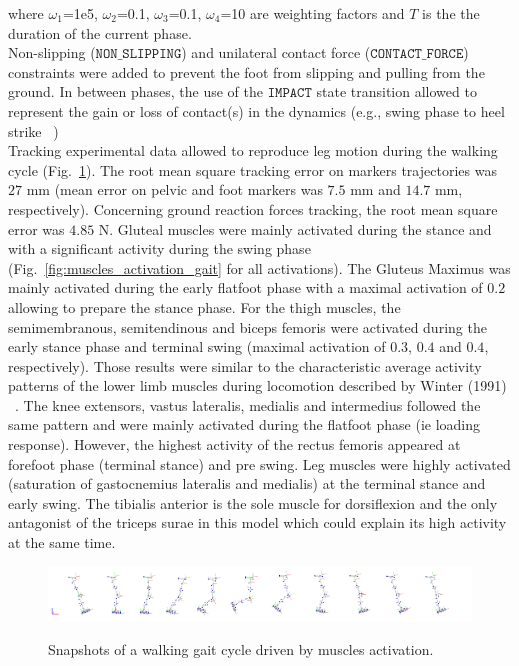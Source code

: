 \noindent where $\omega_1$=1e5, $\omega_2$=0.1, $\omega_3$=0.1, $\omega_4$=10 are  weighting factors and $T$ is the the duration of the current phase.\\

Non-slipping ($\mathtt{NON\_SLIPPING}$) and unilateral contact force ($\mathtt{CONTACT\_FORCE}$) constraints were added to prevent the foot from slipping and pulling from the ground. 
In between phases, the use of the $\mathtt{IMPACT}$ state transition allowed to represent the gain or loss of contact(s) in the dynamics (e.g., swing phase to heel strike ~\cite{felis_synthesis_2016}) \\

Tracking experimental data allowed to reproduce leg motion during the walking cycle (Fig.~\ref{fig:snapshots_multiphase_walking_cycle}). 
The root mean square tracking error on markers trajectories was $27$ mm (mean error on pelvic and foot markers was $7.5$ mm and $14.7$ mm, respectively). 
Concerning ground reaction forces tracking, the root mean square error was $4.85$ N.
Gluteal muscles were mainly activated during the stance and with a significant activity during the swing phase (Fig.~\ref{fig:muscles_activation_gait} for all activations). 
The Gluteus Maximus was mainly activated during the early flatfoot phase with a maximal activation of $0.2$ allowing to prepare the stance phase. 
For the thigh muscles, the semimembranous, semitendinous and biceps femoris were activated during the early stance phase and terminal swing (maximal activation of $0.3$, $0.4$ and $0.4$, respectively). 
Those results were similar to the characteristic average activity patterns of the lower limb muscles during locomotion described by Winter (1991) ~\cite{winter_biomechanics_1991}. 
The knee extensors, vastus lateralis, medialis and intermedius followed the same pattern and were mainly activated during the flatfoot phase (ie loading response).
However, the highest activity of the rectus femoris appeared at forefoot phase (terminal stance) and pre swing.
Leg muscles were highly activated (saturation of gastocnemius lateralis and medialis) at the terminal stance and early swing. The tibialis anterior is the sole muscle for dorsiflexion and the only antagonist of the triceps surae in this model which could explain its high activity at the same time. 

\begin{figure}[t!]
\centering
\includegraphics[width=\textwidth]{figures/multiphase_walking_cycle.png}\\
\caption{Snapshots of a walking gait cycle driven by muscles activation.}
\label{fig:snapshots_multiphase_walking_cycle}
\end{figure}

